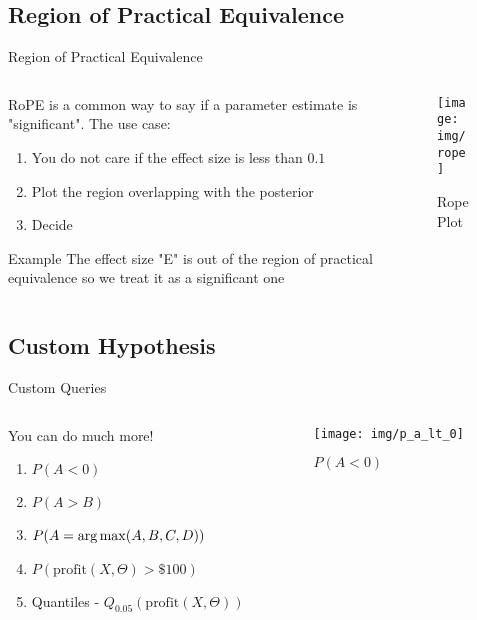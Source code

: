 \documentclass{beamer}
\begin{document}
\subsection{Region of Practical Equivalence}
\begin{frame}{Region of Practical Equivalence}
\begin{columns}
\begin{column}{0.5\linewidth}
RoPE is a common way to say if a parameter estimate is "significant". The use case:
\begin{enumerate}
    \item You do not care if the effect size is less than $0.1$
    \item Plot the region overlapping with the posterior
    \item Decide
\end{enumerate}
\begin{block}{Example}
    The effect size "E" is out of the region of practical equivalence so we treat it as a significant one
\end{block}
\end{column}
\begin{column}{0.5\linewidth}
\begin{figure}
    \centering
    \texttt{[image: img/rope]}
    \caption{Rope Plot}
\end{figure}
\end{column}
\end{columns}
\end{frame}
\subsection{Custom Hypothesis}
\begin{frame}{Custom Queries}
\begin{columns}
    \begin{column}{0.5\linewidth}
    You can do much more!
    \begin{enumerate}
        \item $P(A < 0)$
        \item $P(A > B)$
        \item $P(A = \operatorname*{arg\,max}(A, B, C, D))$
        \item $P(\text{profit}(X, \Theta) > \$100)$
        \item Quantiles - $Q_{0.05}(\text{profit}(X, \Theta))$
    \end{enumerate}
    \end{column}
     \begin{column}{0.5\linewidth}
    \begin{figure}
        \centering
        \texttt{[image: img/p\_a\_lt\_0]}
        \caption{$P(A<0)$}
    \end{figure}
    \end{column}
\end{columns}
    
\end{frame}
\end{document}
